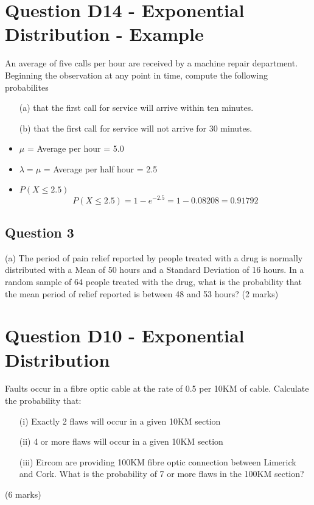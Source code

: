 \documentclass[]{report}
\begin{document}
\section*{Question D14 - Exponential Distribution - Example}

An average of five calls per hour are received by a machine repair department. 
Beginning the observation at any point in time, compute the following probabilites

\begin{itemize} 
	\item[(a)] that the first call 
	for service will arrive within ten minutes.
	\item[(b)] that the first call 
	for service will not arrive for 30 minutes.
\end{itemize}

\begin{itemize}
	\item $\mu$ = Average per hour = 5.0
	\item $\lambda= \mu$ = Average per half hour = 2.5
	\item $P(X \leq 2.5) $
	\[P(X \leq 2.5) = 1 - e^{-2.5} = 1 - 0.08208 = 0.91792\]
\end{itemize}

\subsection{Question 3}
(a) 	The period of pain relief reported by people treated with a drug is normally distributed with a Mean of 50 hours and a Standard Deviation of 16 hours.  In a random sample of 64 people treated with the drug, what is the probability that the mean period of relief reported is between 48 and 53 hours?
(2 marks)


\section{Question D10 -  Exponential Distribution}

Faults occur in a fibre optic cable at the rate of 0.5 per 10KM of cable.  Calculate the probability that:

\begin{itemize}
\item[(i)] Exactly 2 flaws will occur in a given 10KM section
\item[(ii)] 4 or more flaws will occur in a given 10KM section
\item[(iii)] Eircom are providing 100KM fibre optic connection between Limerick and Cork.  What is the probability of 7 or more flaws in the 100KM section?	
\end{itemize}				
(6 marks)
\end{document}
